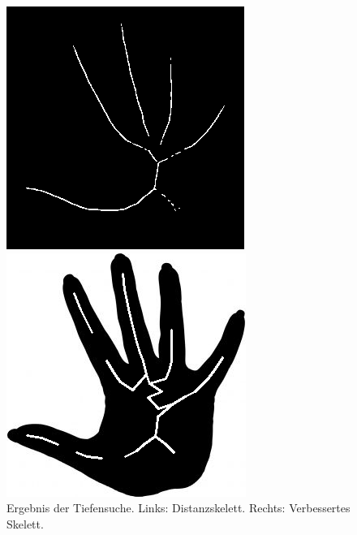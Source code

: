 \begin{figure}[htbp]
	\centering
	\begin{minipage}{5cm}
		\centering
		\includegraphics[width=1.0\linewidth]{./fig/hand-skelett}
	\end{minipage}
	\hspace{2cm}
	\begin{minipage}{5cm}
		\centering
		\includegraphics[width=1.0\linewidth]{./fig/hand-dfs}
	\end{minipage}
	\caption{Ergebnis der Tiefensuche. Links: Distanzskelett. Rechts: Verbessertes Skelett.}
	\label{fig:hand_DFS}
	\end{figure}\\
